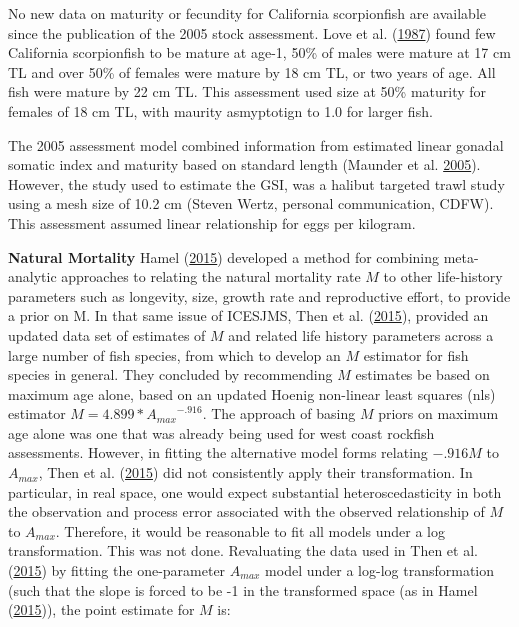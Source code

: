 \documentclass[12pt,]{article}
\begin{document}
No new data on maturity or fecundity for California scorpionfish are
available since the publication of the 2005 stock assessment. Love et
al. (\protect\hyperlink{ref-Love1987}{1987}) found few California
scorpionfish to be mature at age-1, 50\% of males were mature at 17 cm
TL and over 50\% of females were mature by 18 cm TL, or two years of
age. All fish were mature by 22 cm TL. This assessment used size at 50\%
maturity for females of 18 cm TL, with maurity asmyptotign to 1.0 for
larger fish.

The 2005 assessment model combined information from estimated linear
gonadal somatic index and maturity based on standard length (Maunder et
al. \protect\hyperlink{ref-Maunder2005}{2005}). However, the study used
to estimate the GSI, was a halibut targeted trawl study using a mesh
size of 10.2 cm (Steven Wertz, personal communication, CDFW). This
assessment assumed linear relationship for eggs per kilogram.

\vspace{.5cm}

\textbf{Natural Mortality} Hamel
(\protect\hyperlink{ref-Hamel2015}{2015}) developed a method for
combining meta-analytic approaches to relating the natural mortality
rate \(M\) to other life-history parameters such as longevity, size,
growth rate and reproductive effort, to provide a prior on M. In that
same issue of ICESJMS, Then et al.
(\protect\hyperlink{ref-Then2015}{2015}), provided an updated data set
of estimates of \(M\) and related life history parameters across a large
number of fish species, from which to develop an \(M\) estimator for
fish species in general. They concluded by recommending \(M\) estimates
be based on maximum age alone, based on an updated Hoenig non-linear
least squares (nls) estimator \(M= 4.899*{A_{max}}^{-.916}\). The
approach of basing \(M\) priors on maximum age alone was one that was
already being used for west coast rockfish assessments. However, in
fitting the alternative model forms relating \(-.916M\) to \(A_{max}\),
Then et al. (\protect\hyperlink{ref-Then2015}{2015}) did not
consistently apply their transformation. In particular, in real space,
one would expect substantial heteroscedasticity in both the observation
and process error associated with the observed relationship of \(M\) to
\(A_{max}\). Therefore, it would be reasonable to fit all models under a
log transformation. This was not done. Revaluating the data used in Then
et al. (\protect\hyperlink{ref-Then2015}{2015}) by fitting the
one-parameter \(A_{max}\) model under a log-log transformation (such
that the slope is forced to be -1 in the transformed space (as in Hamel
(\protect\hyperlink{ref-Hamel2015}{2015})), the point estimate for \(M\)
is:
\end{document}

